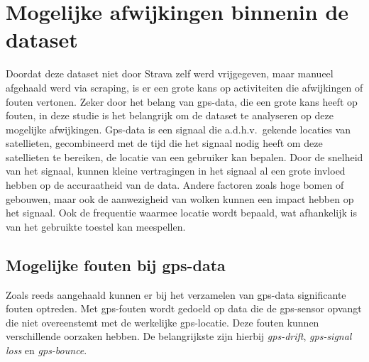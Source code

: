 \section{Mogelijke afwijkingen binnenin de dataset}
Doordat deze dataset niet door Strava zelf werd vrijgegeven, maar manueel
afgehaald werd via scraping, is er een grote kans op activiteiten die
afwijkingen of fouten vertonen. Zeker door het belang van \ac{gps}-data, die
een grote kans heeft op fouten, in deze studie is het belangrijk om de dataset
te analyseren op deze mogelijke afwijkingen. Gps-data is een signaal die
a.d.h.v.\ gekende locaties van satellieten, gecombineerd met de tijd die het
signaal nodig heeft om deze satellieten te bereiken, de locatie van een
gebruiker kan bepalen\cite{BadGPSDa19:online}. Door de snelheid van het
signaal, kunnen kleine vertragingen in het signaal al een grote invloed hebben
op de accuraatheid van de data. Andere factoren zoals hoge bomen of gebouwen,
maar ook de aanwezigheid van wolken kunnen een impact hebben op het signaal.
Ook de frequentie waarmee locatie wordt bepaald, wat afhankelijk is van het
gebruikte toestel kan meespellen.

\subsection{Mogelijke fouten bij gps-data}
Zoals reeds aangehaald kunnen er bij het verzamelen van \ac{gps}-data
significante fouten optreden. Met \ac{gps}-fouten wordt gedoeld op data die de
\ac{gps}-sensor opvangt die niet overeenstemt met de werkelijke
\ac{gps}-locatie. Deze fouten kunnen verschillende oorzaken hebben. De
belangrijkste zijn hierbij \textit{\ac{gps}-drift}, \textit{\ac{gps}-signal
    loss} en \textit{\ac{gps}-bounce}.

